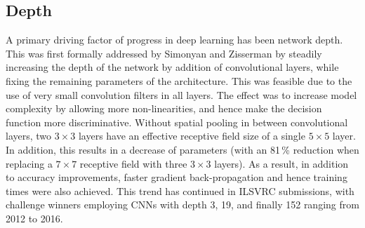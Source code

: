 \documentclass[12pt]{llncs}
\begin{document}
\subsection{Depth}
A primary driving factor of progress in deep learning has been network depth. This was first formally addressed by Simonyan and Zisserman \cite{simonyan2014very} by steadily increasing the depth of the network by addition of convolutional layers, while fixing the remaining parameters of the architecture. This was feasible due to the use of very small convolution filters in all layers. The effect was to increase model complexity by allowing more non-linearities, and hence make the decision function more discriminative. Without spatial pooling in between convolutional layers, two $3 \times 3$ layers have an effective receptive field size of a single $5 \times 5$ layer. In addition, this results in a decrease of parameters (with an 81\,\% reduction when replacing a $7 \times 7$ receptive field with three $3\times3$ layers). As a result, in addition to accuracy improvements, faster gradient back-propagation and hence training times were also achieved. This trend has continued in ILSVRC submissions, with challenge winners employing CNNs with depth 3, 19, and finally 152 \cite{krizhevsky2012imagenet,simonyan2014very,he2016deep} ranging from 2012 to 2016.


\end{document}
